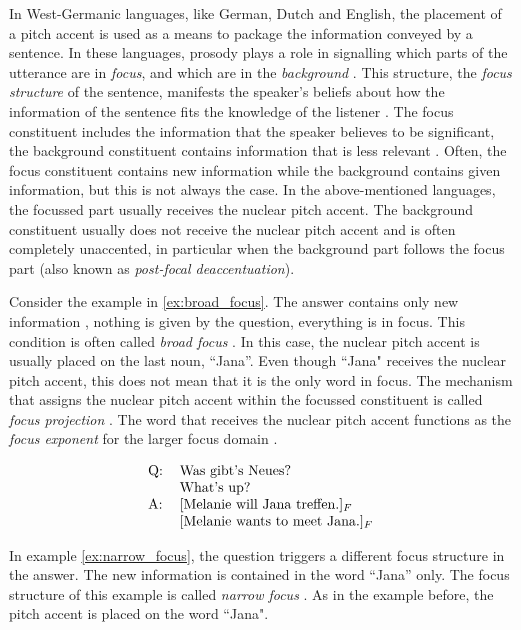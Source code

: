 In West-Germanic languages, like German, Dutch and English, the placement of a pitch accent is used as a means to package the information conveyed by a sentence. In these languages, prosody plays a role in signalling which parts of the utterance are in \emph{focus}, and which are in the \emph{background} \citep{Lambrecht1994}. This structure, the \emph{focus structure} of the sentence, manifests the speaker's beliefs about how the information of the sentence fits the knowledge of the listener \citep{Vallduvi1992}. The focus constituent includes the information that the speaker believes to be significant, the background constituent contains information that is less relevant \citep{Gussenhoven2004}. Often, the focus constituent contains new information while the background contains given information, but this is not always the case. In the above-mentioned languages, the focussed part usually receives the nuclear pitch accent. The background constituent usually does not receive the nuclear pitch accent and is often completely unaccented, in particular when the background part follows the focus part (also known as \emph{post-focal deaccentuation}).

Consider the example in \ref{ex:broad_focus}. The answer contains only new information \citep{Ladd1980, Gussenhoven2004}, nothing is given by the question, everything is in focus. This condition is often called \emph{broad focus} \citep{Ladd1980}. In this case, the nuclear pitch accent is usually placed on the last noun, ``Jana”. Even though ``Jana" receives the nuclear pitch accent, this does not mean that it is the only word in focus. The mechanism that assigns the nuclear pitch accent within the focussed constituent is called \emph{focus projection} \citep{Büring2003, Ladd2008}. The word that receives the nuclear pitch accent functions as the \emph{focus exponent} for the larger focus domain \citep{Ladd2008}. 

\begin{equation}
\begin{tabular}{ll}
Q: & 	Was gibt’s Neues?\\
&	What’s up?\\
A: &	[Melanie will Jana treffen.]$_F$\\
&	[Melanie wants to meet Jana.]$_F$
\end{tabular}
\label{ex:broad_focus}
\end{equation}

In example \ref{ex:narrow_focus}, the question triggers a different focus structure in the answer. The new information is contained in the word ``Jana” only. The focus structure of this example is called \emph{narrow focus} \citep{Ladd1980, Gussenhoven2004}. As in the example before, the pitch accent is placed on the word ``Jana".

